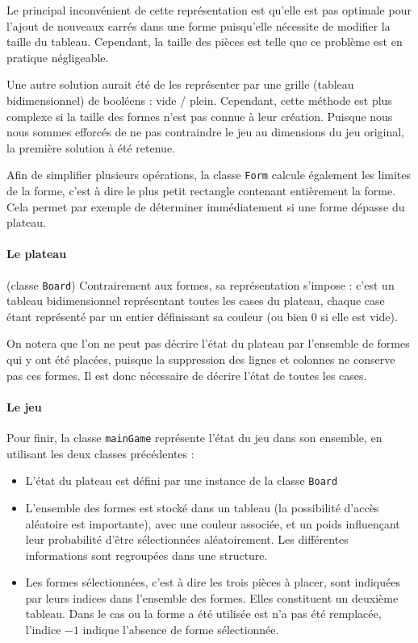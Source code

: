\documentclass[11pt,a4paper]{article}
\begin{document}
Le principal inconvénient de cette représentation est qu'elle est pas optimale pour l'ajout de nouveaux carrés dans une forme puisqu'elle nécessite de modifier la taille du tableau. Cependant, la taille des pièces est telle que ce problème est en pratique négligeable.

Une autre solution aurait été de les représenter par une grille (tableau bidimensionnel) de booléens : vide / plein. Cependant, cette méthode est plus complexe si la taille des formes n'est pas connue à leur création. Puisque nous nous sommes efforcés de ne pas contraindre le jeu au dimensions du jeu original, la première solution à été retenue.

Afin de simplifier plusieurs opérations, la classe \verb"Form" calcule également les limites de la forme, c'est à dire le plus petit rectangle contenant entièrement la forme. Cela permet par exemple de déterminer immédiatement si une forme dépasse du plateau.

\paragraph{Le plateau} (classe \verb"Board")
Contrairement aux formes, sa représentation s'impose : c'est un tableau bidimensionnel représentant toutes les cases du plateau, chaque case étant représenté par un entier définissant sa couleur (ou bien 0 si elle est vide).

On notera que l'on ne peut pas décrire l'état du plateau par l'ensemble de formes qui y ont été placées, puisque la suppression des lignes et colonnes ne conserve pas ces formes. Il est donc nécessaire de décrire l'état de toutes les cases.

\paragraph{Le jeu} 
Pour finir, la classe \verb"mainGame" représente l'état du jeu dans son ensemble, en utilisant les deux classes précédentes :

\begin{itemize}
\item L'état du plateau est défini par une instance de la classe \verb"Board"
\item L'ensemble des formes est stocké dans un tableau (la possibilité d'accès aléatoire est importante), avec une couleur associée, et un poids influençant leur probabilité d'être sélectionnées aléatoirement. Les différentes informations sont regroupées dans une structure.
\item Les formes sélectionnées, c'est à dire les trois pièces à placer, sont indiquées par leurs indices dans l'ensemble des formes. Elles constituent un deuxième tableau. Dans le cas ou la forme a été utilisée est n'a pas été remplacée, l'indice $-1$ indique l'absence de forme sélectionnée.
\end{itemize}
\end{document}
